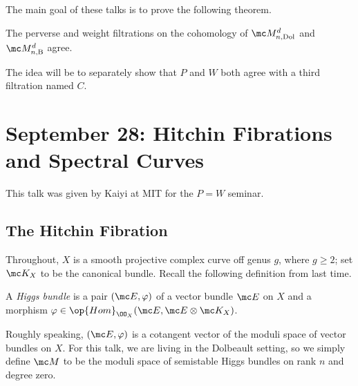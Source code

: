 \documentclass{article}
\begin{document}
The main goal of these talks is to prove the following theorem.
\begin{theorem}
	The perverse and weight filtrations on the cohomology of $\mc M_{n,\mathrm{Dol}}^d$ and $\mc M_{n,\mathrm B}^d$ agree.
\end{theorem}
The idea will be to separately show that $P$ and $W$ both agree with a third filtration named $C$.

\section{September 28: Hitchin Fibrations and Spectral Curves}
This talk was given by Kaiyi at MIT for the $P=W$ seminar.

\subsection{The Hitchin Fibration}
Throughout, $X$ is a smooth projective complex curve off genus $g$, where $g\ge2$; set $\mc K_X$ to be the canonical bundle. Recall the following definition from last time.
\begin{definition}
	A \textit{Higgs bundle} is a pair $(\mc E,\varphi)$ of a vector bundle $\mc E$ on $X$ and a morphism $\varphi\in\op{Hom}_{\OO_X}(\mc E,\mc E\otimes\mc K_X)$.
\end{definition}
Roughly speaking, $(\mc E,\varphi)$ is a cotangent vector of the moduli space of vector bundles on $X$. For this talk, we are living in the Dolbeault setting, so we simply define $\mc M$ to be the moduli space of semistable Higgs bundles on rank $n$ and degree zero.
\end{document}
